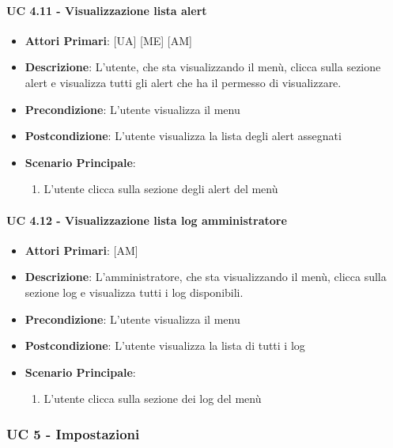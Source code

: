 			\paragraph{UC 4.11 - Visualizzazione lista alert}
			\begin{itemize}
				\item \textbf{Attori Primari}: [UA] [ME] [AM]
				\item \textbf{Descrizione}: L'utente, che sta visualizzando il menù, clicca sulla sezione alert e visualizza tutti gli alert che ha il permesso di visualizzare. 
				\item \textbf{Precondizione}: L'utente visualizza il menu
				\item \textbf{Postcondizione}: L'utente visualizza la lista degli alert assegnati
				\item \textbf{Scenario Principale}:
				\begin{enumerate}
					\item{L'utente clicca sulla sezione degli alert del menù}
				\end{enumerate}	
			\end{itemize}

			\paragraph{UC 4.12 - Visualizzazione lista log amministratore}
			\begin{itemize}
				\item \textbf{Attori Primari}: [AM]
				\item \textbf{Descrizione}: L'amministratore, che sta visualizzando il menù, clicca sulla sezione log e visualizza tutti i log disponibili.
				\item \textbf{Precondizione}: L'utente visualizza il menu
				\item \textbf{Postcondizione}: L'utente visualizza la lista di tutti i log
				\item \textbf{Scenario Principale}:
				\begin{enumerate}
					\item{L'utente clicca sulla sezione dei log del menù}
				\end{enumerate}	
			\end{itemize}

		\subsubsection{UC 5 - Impostazioni}

